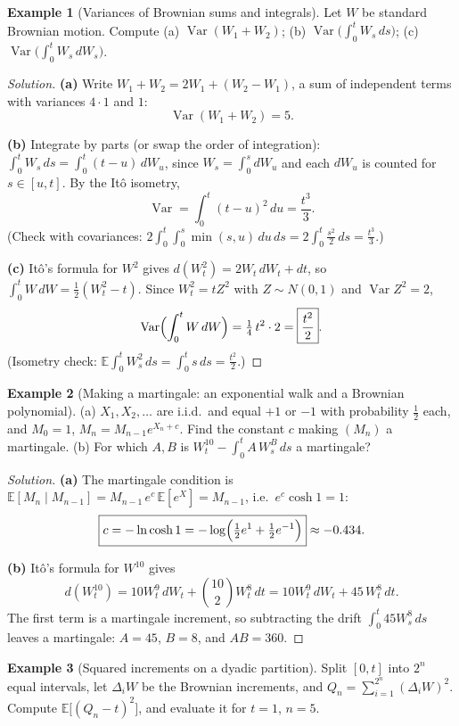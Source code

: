 \documentclass[11pt]{article}
\theoremstyle{definition}
\newtheorem{example}{Example}[section]
\newcommand{\E}{\mathbb{E}}
\newcommand{\Var}{\operatorname{Var}}
\begin{document}
\begin{example}[Variances of Brownian sums and integrals]
Let $W$ be standard Brownian motion. Compute (a) $\Var(W_1+W_2)$; (b) $\Var\!\bigl(\int_0^tW_s\,ds\bigr)$; (c) $\Var\!\bigl(\int_0^tW_s\,dW_s\bigr)$.
\end{example}

\begin{proof}[Solution]
\textbf{(a)} Write $W_1+W_2=2W_1+(W_2-W_1)$, a sum of independent terms with variances $4\cdot1$ and $1$:
\[
\Var(W_1+W_2)=\boxed{5}.
\]

\textbf{(b)} Integrate by parts (or swap the order of integration): $\int_0^tW_s\,ds=\int_0^t(t-u)\,dW_u$, since $W_s=\int_0^s dW_u$ and each $dW_u$ is counted for $s\in[u,t]$. By the It\^o isometry,
\[
\Var=\int_0^t(t-u)^2\,du=\boxed{\frac{t^3}3}.
\]
(Check with covariances: $2\int_0^t\!\int_0^s\min(s,u)\,du\,ds=2\int_0^t\tfrac{s^2}2\,ds=\tfrac{t^3}3$.)

\textbf{(c)} It\^o's formula for $W^2$ gives $d(W_t^2)=2W_t\,dW_t+dt$, so $\int_0^tW\,dW=\tfrac12(W_t^2-t)$. Since $W_t^2=tZ^2$ with $Z\sim N(0,1)$ and $\Var Z^2=2$,
\[
\Var\Bigl(\int_0^tW\,dW\Bigr)=\tfrac14\,t^2\cdot2=\boxed{\frac{t^2}2}.
\]
(Isometry check: $\E\int_0^tW_s^2\,ds=\int_0^ts\,ds=\tfrac{t^2}2$.)
\end{proof}

\begin{example}[Making a martingale: an exponential walk and a Brownian polynomial]
(a) $X_1,X_2,\dots$ are i.i.d.\ and equal $+1$ or $-1$ with probability $\tfrac12$ each, and $M_0=1$, $M_n=M_{n-1}e^{X_n+c}$. Find the constant $c$ making $(M_n)$ a martingale. (b) For which $A,B$ is $W_t^{10}-\int_0^tA\,W_s^B\,ds$ a martingale?
\end{example}

\begin{proof}[Solution]
\textbf{(a)} The martingale condition is $\E[M_n\mid M_{n-1}]=M_{n-1}\,e^{c}\,\E[e^{X}]=M_{n-1}$, i.e.\ $e^{c}\cosh1=1$:
\[
\boxed{c=-\ln\cosh1=-\log\Bigl(\tfrac12e^{1}+\tfrac12e^{-1}\Bigr)}\approx-0.434.
\]

\textbf{(b)} It\^o's formula for $W^{10}$ gives
\[
d(W_t^{10})=10W_t^9\,dW_t+\binom{10}2W_t^8\,dt=10W_t^9\,dW_t+45\,W_t^8\,dt.
\]
The first term is a martingale increment, so subtracting the drift $\int_0^t45W_s^8\,ds$ leaves a martingale: $A=45$, $B=8$, and $AB=\boxed{360}$.
\end{proof}

\begin{example}[Squared increments on a dyadic partition]
Split $[0,t]$ into $2^n$ equal intervals, let $\Delta_iW$ be the Brownian increments, and $Q_n=\sum_{i=1}^{2^n}(\Delta_iW)^2$. Compute $\E\bigl[(Q_n-t)^2\bigr]$, and evaluate it for $t=1$, $n=5$.
\end{example}
\end{document}

